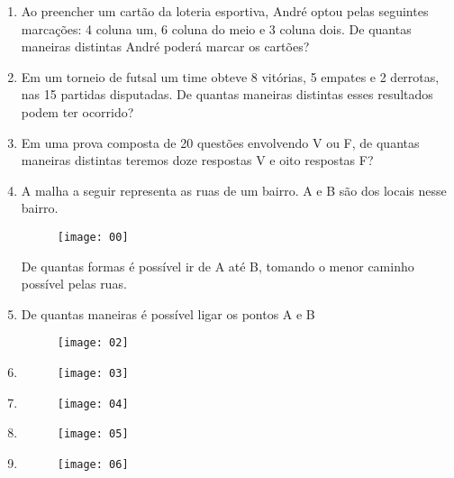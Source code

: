 \documentclass[twocolumn,oneside,a4paper,12pt]{article}
\begin{document}
\begin{enumerate}
\item Ao preencher um cartão da loteria esportiva, André optou pelas seguintes marcações: 4 coluna um, 6 coluna do meio e 3 coluna dois. De quantas maneiras distintas André poderá marcar os cartões? 

\item Em um torneio de futsal um time obteve 8 vitórias, 5 empates e 2 derrotas, nas 15 partidas disputadas. De quantas maneiras distintas esses resultados podem ter ocorrido?

\item Em uma prova composta de 20 questões envolvendo V ou F, de quantas maneiras distintas teremos doze respostas V e oito respostas F? 

\item A malha a seguir representa as ruas de um bairro. A e B são dos locais nesse bairro.

	\begin{figure}[!tbh]
	\center
	\texttt{[image: 00]}
	\end{figure}

\noindent De quantas formas é possível ir de A até B, tomando o menor caminho possível pelas ruas.
	
\item De quantas maneiras é possível ligar os pontos A e B 

	\begin{figure}[!tbh]
	\center
	\texttt{[image: 02]}
	\end{figure}

\item

	\begin{figure}[!tbh]
	\center
	\texttt{[image: 03]}
	\end{figure}

\item

	\begin{figure}[!tbh]
	\center
	\texttt{[image: 04]}
	\end{figure}
	
\item

	\begin{figure}[!tbh]
	\center
	\texttt{[image: 05]}
	\end{figure}


\item

	\begin{figure}[!tbh]
	\center
	\texttt{[image: 06]}
	\end{figure}
	


\end{enumerate}
\end{document}
